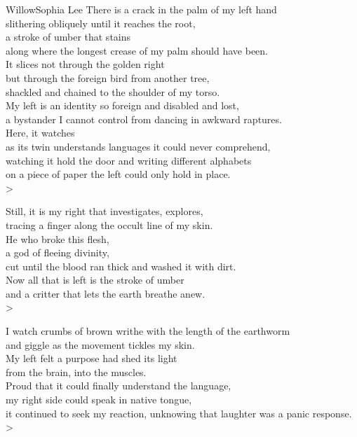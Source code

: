\begin{poetry}{Willow}{Sophia Lee}
    There is a crack in the palm of my left hand\\
    slithering obliquely until it reaches the root,\\
    a stroke of umber that stains\\
    along where the longest crease of my palm should have been.\\
    It slices not through the golden right\\
    but through the foreign bird from another tree,\\
    shackled and chained to the shoulder of my torso.\\
    My left is an identity so foreign and disabled and lost,\\
    a bystander I cannot control from dancing in awkward raptures.\\
    Here, it watches\\
    as its twin understands languages it could never comprehend,\\
    watching it hold the door and writing different alphabets\\
    on a piece of paper the left could only hold in place.\\>
    
    Still, it is my right that investigates, explores,\\
    tracing a finger along the occult line of my skin.\\
    He who broke this flesh,\\
    a god of fleeing divinity,\\
    cut until the blood ran thick and washed it with dirt.\\
    Now all that is left is the stroke of umber\\
    and a critter that lets the earth breathe anew.\\>
    
    I watch crumbs of brown writhe with the length of the earthworm\\
    and giggle as the movement tickles my skin.\\
    My left felt a purpose had shed its light\\
    from the brain, into the muscles.\\
    Proud that it could finally understand the language,\\
    my right side could speak in native tongue,\\
    it continued to seek my reaction, unknowing that laughter was a panic response.\\>
    

\end{poetry}
